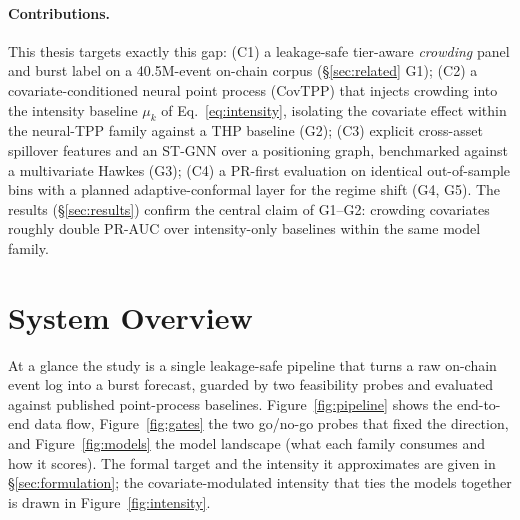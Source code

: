 \documentclass[11pt,a4paper]{article}
\begin{document}
\paragraph{Contributions.} This thesis targets exactly this gap: (C1) a leakage-safe tier-aware \emph{crowding} panel and burst label on a 40.5M-event on-chain corpus (\S\ref{sec:related} G1); (C2) a covariate-conditioned neural point process (CovTPP) that injects crowding into the intensity baseline $\mu_k$ of Eq.~\eqref{eq:intensity}, isolating the covariate effect within the neural-TPP family against a THP baseline (G2); (C3) explicit cross-asset spillover features and an ST-GNN over a positioning graph, benchmarked against a multivariate Hawkes (G3); (C4) a PR-first evaluation on identical out-of-sample bins with a planned adaptive-conformal layer for the regime shift (G4, G5). The results (\S\ref{sec:results}) confirm the central claim of G1--G2: crowding covariates roughly double PR-AUC over intensity-only baselines within the same model family.

\section{System Overview}
\label{sec:system}

At a glance the study is a single leakage-safe pipeline that turns a raw on-chain event log into a burst forecast, guarded by two feasibility probes and evaluated against published point-process baselines. Figure~\ref{fig:pipeline} shows the end-to-end data flow, Figure~\ref{fig:gates} the two go/no-go probes that fixed the direction, and Figure~\ref{fig:models} the model landscape (what each family consumes and how it scores). The formal target and the intensity it approximates are given in \S\ref{sec:formulation}; the covariate-modulated intensity that ties the models together is drawn in Figure~\ref{fig:intensity}.
\end{document}
